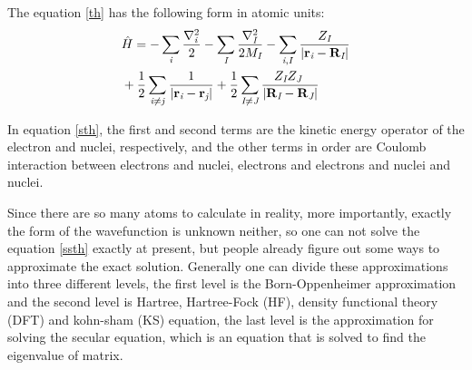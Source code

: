\documentclass[a4paper, 12pt, titlepage,oneside,drop]{kthesis}
\begin{document}
\noindent The equation \ref{th} has the following form in atomic units:
\
\begin{equation}\label{sth}\begin{split}
&\hath = - \sumi<i>   \frac{{{\nabla}_{\textit{i}}^{2}}}{2} - \sumi<I> \frac{{{\nabla}_{\textit{I}}^{2}}}{2 M_\textit{I}}  - \sumij<i><I> \frac{Z_\textit{I}}{|\textbf{r}_\textit{i}-\textbf{R}_\textit{I}|} \\
& + \frac{1}{2} \suminj<i><j> \frac{1}{ |\textbf{r}_\textit{i}-\textbf{r}_\textit{j}|} + \frac{1}{2} \suminj<I><J> \frac{Z_\textit{I} Z_\textit{J}\ }{|\textbf{R}_\textit{I}-\textbf{R}_\textit{J}|}
\end{split}\end{equation}


\noindent In equation \ref{sth}, the first and second terms are the kinetic energy operator of the electron and nuclei, respectively,
and the other terms in order are Coulomb interaction between electrons and nuclei, electrons and electrons and nuclei and nuclei.

\noindent Since there are so many atoms to calculate in reality, more importantly, exactly the form of the wavefunction is unknown neither,
so one can not solve the equation \ref{ssth} exactly at present, but people already figure out some ways to approximate the exact solution. 
Generally one can divide these approximations into three different levels, the first level is the Born-Oppenheimer approximation and the second level is Hartree,
Hartree-Fock (HF), density functional theory (DFT) and kohn-sham (KS) equation, the last level is the approximation for solving the secular equation, 
which is an equation that is solved to find the eigenvalue of matrix.
\end{document}
